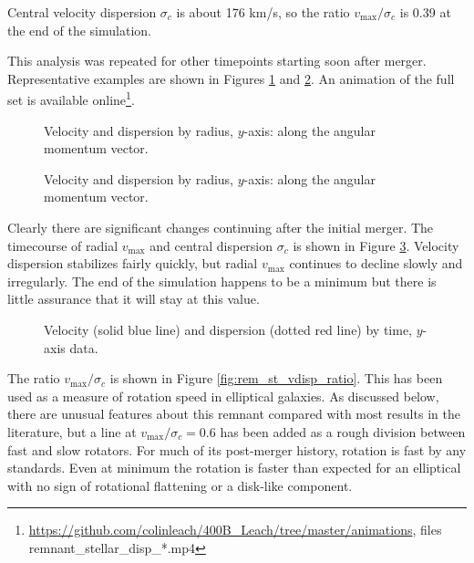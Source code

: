 \documentclass[twocolumn]{aastex63}
\begin{document}
Central velocity dispersion $\sigma_c$ is about 176 km/s, so the ratio $v_{\text{max}} / \sigma_c$ is 0.39 at the end of the simulation.

This analysis was repeated for other timepoints starting soon after merger. Representative examples are shown in Figures \ref{fig:rem_disp_y_450} and \ref{fig:rem_disp_y_600}. An animation of the full set is available online\footnote{\url{https://github.com/colinleach/400B_Leach/tree/master/animations}, files remnant\_stellar\_disp\_*.mp4 }.

\begin{figure}[htb!]
	\caption{Velocity and dispersion by radius, $y$-axis: along the angular momentum vector.
		\label{fig:rem_disp_y_450}}
\end{figure}

\begin{figure}[htb!]
	\caption{Velocity and dispersion by radius, $y$-axis: along the angular momentum vector.
		\label{fig:rem_disp_y_600}}
\end{figure}

Clearly there are significant changes continuing after the initial merger. The timecourse of radial $v_{\text{max}}$ and central dispersion $\sigma_c$ is shown in Figure \ref{fig:rem_st_vdisp_tc}. Velocity dispersion stabilizes fairly quickly, but radial $v_{\text{max}}$ continues to decline slowly and irregularly. The end of the simulation happens to be a minimum but there is little assurance that it will stay at this value.

\begin{figure}[htb!]
	\caption{Velocity (solid blue line) and dispersion (dotted red line) by time, $y$-axis data.
		\label{fig:rem_st_vdisp_tc}}
\end{figure}

The ratio $v_{\text{max}} / \sigma_c$ is shown in Figure \ref{fig:rem_st_vdisp_ratio}. This has been used as a measure of rotation speed in elliptical galaxies. As discussed below, there are unusual features about this remnant compared with most results in the literature, but a line at $v_{\text{max}} / \sigma_c = 0.6$ has been added as a rough division between fast and slow rotators. For much of its post-merger history, rotation is fast by any standards. Even at minimum the rotation is faster than expected for an elliptical with no sign of rotational flattening or a disk-like component.
\end{document}
